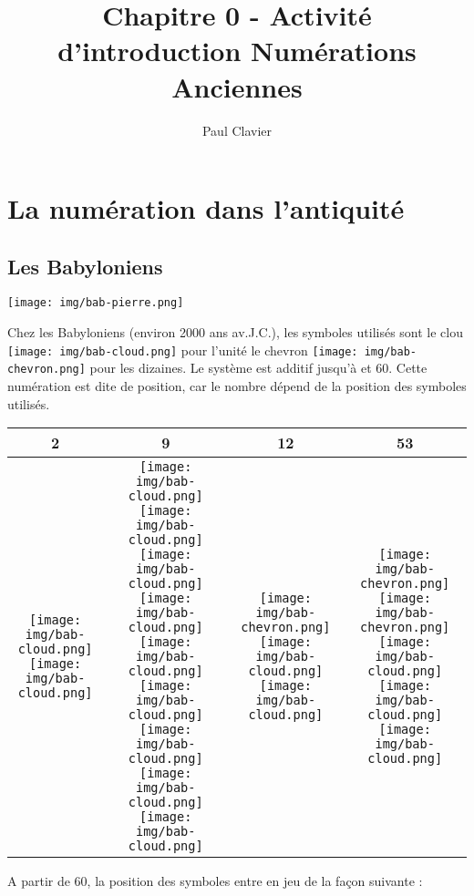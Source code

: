 \documentclass[12pt,a4paper]{article}
\author{Paul Clavier}
\title{Chapitre 0 - Activité d'introduction Numérations Anciennes}
\begin{document}
\renewcommand\thesection{\Roman{section}}
\renewcommand\thesubsection{\arabic{subsection}}


\ifdefined\isprof
	\TeacherModeOn
\fi



\newcommand{\clou}{\texttt{[image: img/bab-cloud.png]}}
\newcommand{\chevron}{\texttt{[image: img/bab-chevron.png]}}



\begin{center}
\end{center}

\section{La numération dans l'antiquité}
\subsection{Les Babyloniens}

\begin{minipage}{0.2\textwidth}
\texttt{[image: img/bab-pierre.png]} 
\end{minipage}
\begin{minipage}{0.8\textwidth}

Chez les Babyloniens (environ 2000 ans av.J.C.), les symboles utilisés sont le clou \texttt{[image: img/bab-cloud.png]} pour l’unité le chevron \texttt{[image: img/bab-chevron.png]} pour les dizaines. Le système est additif jusqu’à et 60. 
Cette numération est dite de position, car le nombre dépend de la position des symboles utilisés.
\begin{center}
\begin{tabular}{|c|c|c|c|}
\hline
2 & 9 & 12 & 53 \\ \hline
\clou\clou & \clou\clou\clou\clou\clou\clou\clou\clou\clou & \chevron\clou\clou & \chevron\chevron\clou\clou\clou
\\ \hline
\end{tabular}
\end{center}
A partir de 60, la position des symboles entre en jeu de la façon suivante : 
\end{minipage}
\end{document}
